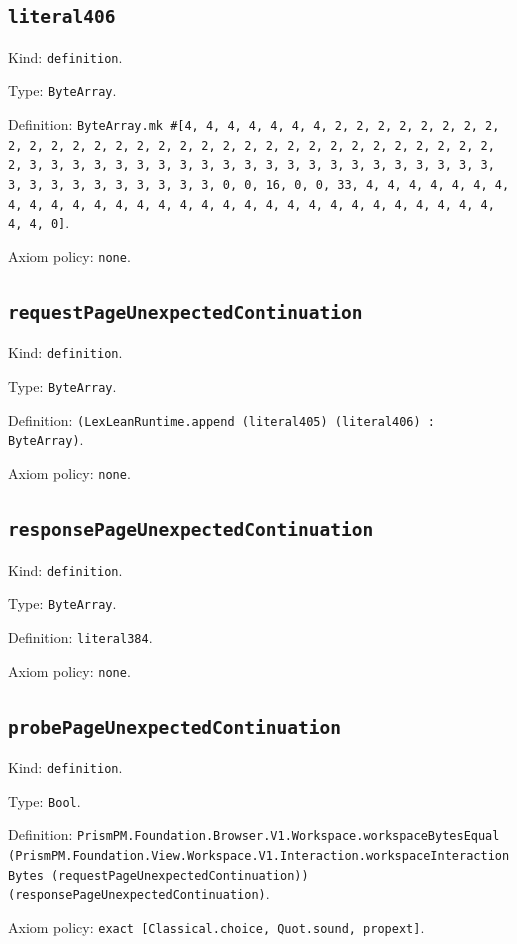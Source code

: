 \documentclass[11pt]{article}
\begin{document}
\subsection*{\texttt{literal406}}
\noindent Kind: \texttt{definition}.\par
\noindent Type: \texttt{ByteArray}.\par
\noindent Definition: \texttt{ByteArray.mk \#[4, 4, 4, 4, 4, 4, 4, 2, 2, 2, 2, 2, 2, 2, 2, 2, 2, 2, 2, 2, 2, 2, 2, 2, 2, 2, 2, 2, 2, 2, 2, 2, 2, 2, 2, 2, 2, 2, 2, 3, 3, 3, 3, 3, 3, 3, 3, 3, 3, 3, 3, 3, 3, 3, 3, 3, 3, 3, 3, 3, 3, 3, 3, 3, 3, 3, 3, 3, 3, 3, 3, 0, 0, 16, 0, 0, 33, 4, 4, 4, 4, 4, 4, 4, 4, 4, 4, 4, 4, 4, 4, 4, 4, 4, 4, 4, 4, 4, 4, 4, 4, 4, 4, 4, 4, 4, 4, 4, 4, 0]}.\par
\noindent Axiom policy: \texttt{none}.\par
\subsection*{\texttt{requestPageUnexpectedContinuation}}
\noindent Kind: \texttt{definition}.\par
\noindent Type: \texttt{ByteArray}.\par
\noindent Definition: \texttt{(LexLeanRuntime.append (literal405) (literal406) : ByteArray)}.\par
\noindent Axiom policy: \texttt{none}.\par
\subsection*{\texttt{responsePageUnexpectedContinuation}}
\noindent Kind: \texttt{definition}.\par
\noindent Type: \texttt{ByteArray}.\par
\noindent Definition: \texttt{literal384}.\par
\noindent Axiom policy: \texttt{none}.\par
\subsection*{\texttt{probePageUnexpectedContinuation}}
\noindent Kind: \texttt{definition}.\par
\noindent Type: \texttt{Bool}.\par
\noindent Definition: \texttt{PrismPM.Foundation.Browser.V1.Workspace.workspaceBytesEqual (PrismPM.Foundation.View.Workspace.V1.Interaction.workspaceInteractionBytes (requestPageUnexpectedContinuation)) (responsePageUnexpectedContinuation)}.\par
\noindent Axiom policy: \texttt{exact [Classical.choice, Quot.sound, propext]}.\par
\end{document}
